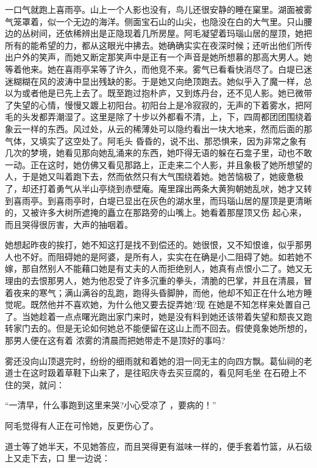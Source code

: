 \documentclass{article}
\begin{document}
一口气就跑上喜雨亭。山上一个人影也没有，鸟儿还很安静的睡在窠里。湖面被雾气笼罩着，似一个无边的海洋。侧面宝石山的山尖，也隐没在白的大气里。只山腰边的丛树间，还依稀辨出是正隐现着几所房屋。阿毛凝望着玛瑙山居的屋顶，她把所有的能希望的力，都从这眼光中拂去。她确确实实在夜深时候；还听出他们所传出户外的笑声，而她又断定那笑声中是正有一个声音是她所想慕的那高大男人。她等着他来。她在喜雨亭呆等了许久，而他竞不来。雾气已看看快消尽了。白堤已迷迷糊糊在风的波涛中显出残缺的影。于是她又向绝顶跑去。她似乎入了魔一样，总以为或者他是已先上去了。既至跑过抱朴庐，又到炼丹台，还不见人影。她已微带了失望的心情，慢慢又踱上初阳台。初阳台上是冷寂寂的，无声的下着雾水，把阿毛的头发都弄潮湿了。这里是除了十步以外都看不清，上，下，四周都团团围绕着象云一样的东西。风过处，从云的稀薄处可以隐约看出一块大地来，然而后面的那气体，又填实了这空处了。阿毛头
\newpage
昏昏的，说不出、那恐惧来，因为非常之象有几次的梦境，她看见那向她乱涌来的东西，她吓得无语的躲在石龛子里，动也不敢一动。正在这时，她仿佛又看见那路上，正走来二个人影，并且象极了她所想望的人，于是她又叫着跑下去，然而依然只有大气围绕着她。她苦恼极了，她疲惫极了，却还打着勇气从半山亭绕到赤壁庵。庵里蹿出两条大黄狗朝她乱吠，她才又转到喜雨亭。到喜雨亭时，白堤已显出在灰色的湖水里，而玛瑙山居的屋顶是更清晰的，又被许多大树所遮掩的矗立在那路旁的山嘴上。她看着那屋顶又伤
起心来，而且哭得很厉害，大声的抽咽着。 

她想起昨夜的挨打，她不知这打是找不到偿还的。她很恨，又不知恨谁，似乎那男人也不好。而阻碍她的是阿婆，是所有人，实实在在确是小二阻碍了她。如若她不嫁，那自然别人不能藉口她是有丈夫的人而拒绝别人，她真有点恨小二了。她又无理由的去恨那男人，她为他忍受了许多沉重的拳头，清脆的巴掌，并且在清晨，冒着夜来的寒气；满山满谷的乱跑，跑得头昏脚肿，而他，他却不知正在什么地方睡觉呢。既然他并不喜欢她，为什么他又要去捉弄她?现
\newpage
在她是不知怎样来处置自己了。当她趁着一点点曙光跑出家门来时，她是没有料到她还该带着失望和颓丧又跑转家门去的。但是无论如何她总不能便留在这山上而不回去。假使竟象她所想的，那男人便在这有着
浓雾的清晨而把她带走不是顶好的事吗? 

雾还没向山顶退完时，纷纷的细雨就和着她的泪一同无主的向四方飘。葛仙祠的老道士在这时趿着草鞋下山来了，是往昭庆寺去买豆腐的，看见阿毛坐
在石磴上不住的哭，就问： 

“一清早，什么事跑到这里来哭?小心受凉了
，要病的！” 


阿毛觉得有人正在可怜她，反更伤心了。 

道士等了她半天，不见她答应，而且哭得更有滋味一样的，便手套着竹篮，从石级上又走下去，口
里一边说： 


\newpage
\end{document}
